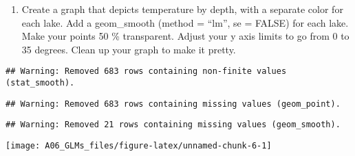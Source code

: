 \documentclass[]{article}
\newenvironment{Shaded}{\begin{snugshade}}{\end{snugshade}}
\newcommand{\KeywordTok}[1]{\textcolor[rgb]{0.13,0.29,0.53}{\textbf{#1}}}
\newcommand{\DataTypeTok}[1]{\textcolor[rgb]{0.13,0.29,0.53}{#1}}
\newcommand{\DecValTok}[1]{\textcolor[rgb]{0.00,0.00,0.81}{#1}}
\newcommand{\StringTok}[1]{\textcolor[rgb]{0.31,0.60,0.02}{#1}}
\newcommand{\CommentTok}[1]{\textcolor[rgb]{0.56,0.35,0.01}{\textit{#1}}}
\newcommand{\OtherTok}[1]{\textcolor[rgb]{0.56,0.35,0.01}{#1}}
\newcommand{\OperatorTok}[1]{\textcolor[rgb]{0.81,0.36,0.00}{\textbf{#1}}}
\newcommand{\NormalTok}[1]{#1}
\providecommand{\tightlist}{%
  \setlength{\itemsep}{0pt}\setlength{\parskip}{0pt}}
\begin{document}
\begin{enumerate}
\def\labelenumi{\arabic{enumi}.}
\setcounter{enumi}{15}
\tightlist
\item
  Create a graph that depicts temperature by depth, with a separate
  color for each lake. Add a geom\_smooth (method = ``lm'', se = FALSE)
  for each lake. Make your points 50 \% transparent. Adjust your y axis
  limits to go from 0 to 35 degrees. Clean up your graph to make it
  pretty.
\end{enumerate}

\begin{Shaded}
\end{Shaded}

\begin{verbatim}
## Warning: Removed 683 rows containing non-finite values (stat_smooth).
\end{verbatim}

\begin{verbatim}
## Warning: Removed 683 rows containing missing values (geom_point).
\end{verbatim}

\begin{verbatim}
## Warning: Removed 21 rows containing missing values (geom_smooth).
\end{verbatim}

\begin{center}\texttt{[image: A06\_GLMs\_files/figure-latex/unnamed-chunk-6-1]} \end{center}
\end{document}
